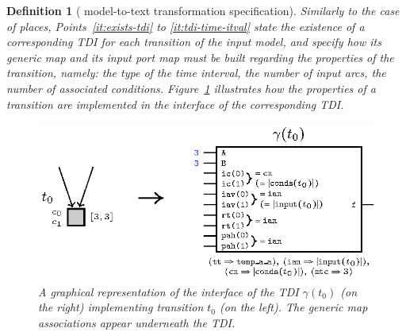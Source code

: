 \documentclass[pdflatex,sn-mathphys]{sn-jnl}%
\theoremstyle{thmstyleone}%
\theoremstyle{thmstyletwo}%
\theoremstyle{thmstylethree}%
\newtheorem{definition}{Definition}%
\begin{document}
\begin{definition}[\hilecop{} model-to-text transformation specification]
  \bigskip

  Similarly to the case of places, Points~\ref{it:exists-tdi} to
  \ref{it:tdi-time-itval} state the existence of a corresponding TDI
  for each transition of the input model, and specify how its generic
  map and its input port map must be built regarding the properties of
  the transition, namely: the type of the time interval, the number of
  input arcs, the number of associated
  conditions. Figure~\ref{fig:gen-tdi-ex} illustrates how the
  properties of a transition are implemented in the interface of the
  corresponding TDI.

  \begin{figure}[h]
    \centering
    \includegraphics[keepaspectratio,width=.8\textwidth]{gen-tdi-ex.eps}
    \caption{A graphical representation of the interface of the TDI
      $\gamma(t_0)$ (on the right) implementing transition $t_0$ (on
      the left). The generic map associations appear underneath the
      TDI.}
    \label{fig:gen-tdi-ex}
  \end{figure}
  

\end{definition}
\end{document}
